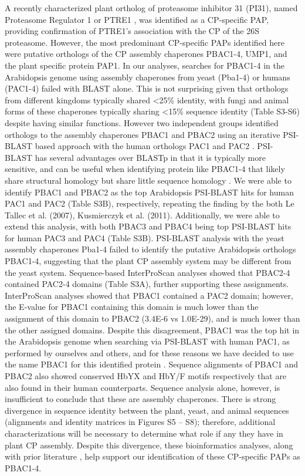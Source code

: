 A recently characterized plant ortholog of proteasome inhibitor 31 (PI31), named Proteasome Regulator 1 or PTRE1 \citep{yang16}, was identified as a CP-specific PAP, providing confirmation of PTRE1’s association with the CP of the 26S proteasome. However, the most predominant CP-specific PAPs identified here were putative orthologs of the CP assembly chaperones PBAC1-4, UMP1, and the plant specific protein PAP1. In our analyses, searches for PBAC1-4 in the Arabidopsis genome using assembly chaperones from yeast (Pba1-4) or humans (PAC1-4) failed with BLAST alone. This is not surprising given that orthologs from different kingdoms typically shared <25\% identity, with fungi and animal forms of these chaperones typically sharing <15\% sequence identity (Table S3-S6) despite having similar functions. However two independent groups identified orthologs to the assembly chaperones PBAC1 and PBAC2 using an iterative PSI-BLAST based approach with the human orthologs PAC1 and PAC2 \citep{kusmierczyk11, le07}. PSI-BLAST has several advantages over BLASTp in that it is typically more sensitive, and can be useful when identifying protein like PBAC1-4 that likely share structural homology but share little sequence homology \citep{altschul97, aravind99, kusmierczyk11, yashiroda08}. We were able to identify PBAC1 and PBAC2 as the top Arabidopsis PSI-BLAST hits for human PAC1 and PAC2 (Table S3B), respectively, repeating the finding by the both Le Tallec et al. (2007), Kusmierczyk et al. (2011). Additionally, we were able to extend this analysis, with both PBAC3 and PBAC4 being top PSI-BLAST hits for human PAC3 and PAC4 (Table S3B). PSI-BLAST analysis with the yeast assembly chaperones Pba1-4 failed to identify the putative Arabidopsis orthologs PBAC1-4, suggesting that the plant CP assembly system may be different from the yeast system. Sequence-based InterProScan analyses showed that PBAC2-4 contained PAC2-4 domains (Table S3A), further supporting these assignments. InterProScan analyses showed that PBAC1 contained a PAC2 domain; however, the E-value for PBAC1 containing this domain is much lower than the assignment of this domain to PBAC2 (3.4E-6 vs 1.0E-29), and is much lower than the other assigned domains. Despite this disagreement, PBAC1 was the top hit in the Arabidopsis genome when searching via PSI-BLAST with human PAC1, as performed by ourselves and others, and for these reasons we have decided to use the name PBAC1 for this identified protein \citep{kusmierczyk11, le07}. Sequence alignments of PBAC1 and PBAC2 also showed conserved HbYX and HbY/F motifs respectively that are also found in their human counterparts. Sequence analysis alone, however, is insufficient to conclude that these are assembly chaperones. There is strong divergence in sequence identity between the plant, yeast, and animal sequences (alignments and identity matrices in Figures S5 – S8); therefore, additional characterizations will be necessary to determine what role if any they have in plant CP assembly. Despite this divergence, these bioinformatics analyses, along with prior literature \citep{kusmierczyk11, le07}, help support our identification of these CP-specific PAPs as PBAC1-4.

